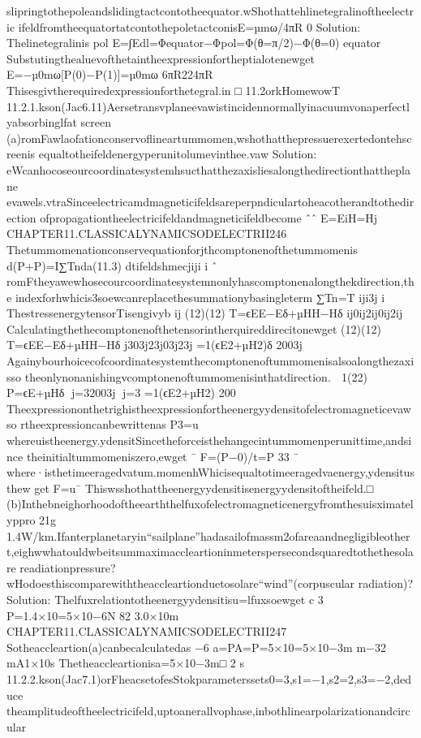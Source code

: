{{{{{{{{{{{{{{{{slipringtothepoleandslidingtactcontotheequator.wShothattehlinetegralinoftheelectric
ifeldfromtheequatortatcontothepoletactconisE=µmω/4πR
0
Solution:
Thelinetegralinis
pol
E=∫Edl=Φequator−Φpol=Φ(θ=π/2)−Φ(θ=0)
equator
Substutingthealuevofthetaintheexpressionfortheptialotenewget
E=−µ0mω[P(0)−P(1)]=µ0mω
6πR224πR
Thisesgivtherequiredexpressionforthetegral.in
□
11.2orkHomewowT
11.2.1.kson(Jac6.11)Aersetransvplaneevawistincidennormallyinacuumvonaperfectlyabsorbinglfat
screen
(a)romFawlaofationconservoflineartummomen,wshothatthepressuerexertedontehscreenis
equaltotheifeldenergyperunitolumevinthee.vaw
Solution:
eWcanhocoseourcoordinatesystemhsucthatthezaxisliesalongthedirectionthattheplane
evawels.vtraSinceelectricamdmagneticifeldsareperpndiculartoheacotherandtothedirection
ofpropagationtheelectricifeldandmagneticifeldbecome
ˆˆ
E=EiH=Hj
CHAPTER11.CLASSICALYNAMICSODELECTRII246
Thetummomenationconservequationforjthcomptonenofthetummomenis
d(P+P)=I∑Tnda(11.3)
dtifeldshmecjiji
i
ˆ
romFtheyawewhosecourcoordinatesystemnonlyhascomptonenalongthekdirection,the
indexforhwhicis3soewcanreplacethesummationybasingleterm
∑Tn=T
iji3j
i
ThestressenergytensorTisengivyb
ij
(12)(12)
T=ϵEE−Eδ+µHH−Hδ
ij0ij2ij0ij2ij
Calculatingthethecomptonenofthetensorintherquireddirecitonewget
(12)(12)
T=ϵEE−Eδ+µHH−Hδ
j303j23j03j23j
=1(ϵE2+µH2)δ
2003j
Againybourhoicecofcoordinatesystemthecomptonenoftummomenisalsoalongthezaxisso
theonlynonanishingvcomptonenoftummomenisinthatdirection.

1(22)
P=ϵE+µHδ
j=32003j
j=3
=1(ϵE2+µH2)
200
Theexpressiononthetrighistheexpressionfortheenergyydensitofelectromagneticevawso
rtheexpressioncanbewrittenas
P3=u
whereuistheenergy.ydensitSincetheforceisthehangecintummomenperunittime,andsince
theinitialtummomeniszero,ewget
¯
F=(P−0)/t=P
33
¯
where·isthetimeeragedvatum.momenhWhicisequaltotimeeragedvaenergy,ydensitusthew
get
F=u¯
Thiswsshothattheenergyydensitisenergyydensitoftheifeld.□
(b)Inthebneighorhoodoftheearththelfuxofelectromagneticenergyfromthesuisximatelyppro
21g
1.4W/km.Ifanterplanetaryin“sailplane”hadasailofmassm2ofareaandnegligibleother
t,eighwwhatouldwbeitsummaximaccleartioninmeterspersecondsquaredtothethesolare
readiationpressure?wHodoesthiscomparewiththeaccleartionduetosolare“wind”(corpuscular
radiation)?
Solution:
Thelfuxrelationtotheenergyydensitisu=lfuxsoewget
c
3
P=1.4×10=5×10−6N
82
3.0×10m
CHAPTER11.CLASSICALYNAMICSODELECTRII247
Sotheaccleartion(a)canbecalculatedas
−6
a=PA=P=5×10=5×10−3m
m−32
mA1×10s
Thetheaccleartionisa=5×10−3m□
2
s
11.2.2.kson(Jac7.1)orFheacsetofesStokparameterssets0=3,s1=−1,s2=2,s3=−2,deduce
theamplitudeoftheelectricifeld,uptoanerallvophase,inbothlinearpolarizationandcircular
}}}}}}}}}}}}}}}}
